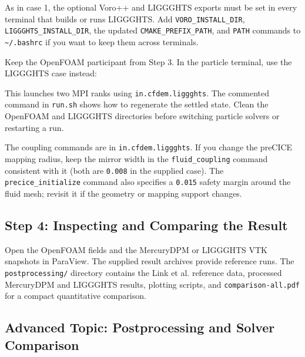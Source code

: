 As in case 1, the optional Voro++ and LIGGGHTS exports must be set in
every terminal that builds or runs LIGGGHTS. Add
\nolinkurl{VORO_INSTALL_DIR}, \nolinkurl{LIGGGHTS_INSTALL_DIR}, the
updated \nolinkurl{CMAKE_PREFIX_PATH}, and \nolinkurl{PATH} commands to
\nolinkurl{~/.bashrc} if you want to keep them across terminals.

Keep the OpenFOAM participant from Step 3. In the particle terminal, use
the LIGGGHTS case instead:

\noindent\begin{minipage}{\linewidth}
\end{minipage}

This launches two MPI ranks using \nolinkurl{in.cfdem.liggghts}. The
commented command in \nolinkurl{run.sh} shows how to regenerate the
settled state. Clean the OpenFOAM and LIGGGHTS directories before
switching particle solvers or restarting a run.

The coupling commands are in \nolinkurl{in.cfdem.liggghts}. If you
change the preCICE mapping radius, keep the mirror width in the
\nolinkurl{fluid_coupling} command consistent with it (both are
\nolinkurl{0.008} in the supplied case). The
\nolinkurl{precice_initialize} command also specifies a
\nolinkurl{0.015} safety margin around the fluid mesh; revisit it if the
geometry or mapping support changes.

\subsection{Step 4: Inspecting and Comparing the
Result}\label{03-link-fluidized-bed__readmemd__step-4-inspecting-and-comparing-the-result}

Open the OpenFOAM fields and the MercuryDPM or LIGGGHTS VTK snapshots in
ParaView. The supplied result archives provide reference runs. The
\nolinkurl{postprocessing/} directory contains the Link et al. reference
data, processed MercuryDPM and LIGGGHTS results, plotting scripts, and
\nolinkurl{comparison-all.pdf} for a compact quantitative comparison.

\subsection{Advanced Topic: Postprocessing and Solver
Comparison}\label{03-link-fluidized-bed__readmemd__advanced-topic-postprocessing-and-solver-comparison}

